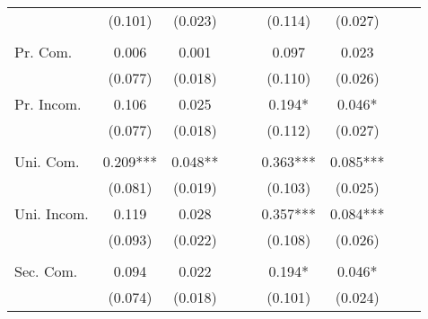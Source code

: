 \begin{table}
{\begin{threeparttable}
\begin{tabular}{lcccccccc}
                    &     (0.101)   &     (0.023)   &               &               &     (0.114)   &     (0.027)   &               &               \\
                    &               &               &               &               &               &               &               &               \\
Pr. Com.            &       0.006   &       0.001   &               &               &       0.097   &       0.023   &               &               \\
                    &     (0.077)   &     (0.018)   &               &               &     (0.110)   &     (0.026)   &               &               \\
Pr. Incom.          &       0.106   &       0.025   &               &               &       0.194*  &       0.046*  &               &               \\
                    &     (0.077)   &     (0.018)   &               &               &     (0.112)   &     (0.027)   &               &               \\
                    &               &               &               &               &               &               &               &               \\
Uni. Com.           &       0.209***&       0.048** &               &               &       0.363***&       0.085***&               &               \\
                    &     (0.081)   &     (0.019)   &               &               &     (0.103)   &     (0.025)   &               &               \\
Uni. Incom.         &       0.119   &       0.028   &               &               &       0.357***&       0.084***&               &               \\
                    &     (0.093)   &     (0.022)   &               &               &     (0.108)   &     (0.026)   &               &               \\
                    &               &               &               &               &               &               &               &               \\
Sec. Com.           &       0.094   &       0.022   &               &               &       0.194*  &       0.046*  &               &               \\
                    &     (0.074)   &     (0.018)   &               &               &     (0.101)   &     (0.024)   &               &               \\

\end{tabular}
\end{threeparttable}}
\end{table}
